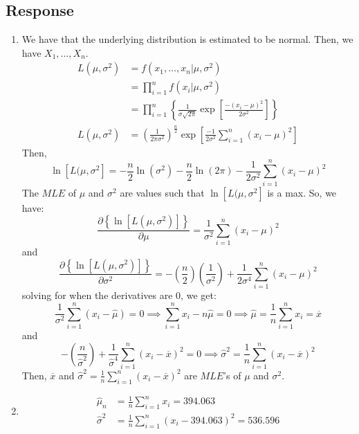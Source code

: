 \documentclass[13pt]{article}
\begin{document}
\subsection*{Response}
\begin{enumerate}[label=(\alph*)]
\item We have that the underlying distribution is estimated to be normal. Then, we have $X_1, \ldots, X_n$.
  \begin{align*}
    L(\mu, \sigma^2) &= f(x_1, \ldots, x_n | \mu, \sigma^2) \\
                     &= \prod_{i = 1}^{n} f(x_i | \mu, \sigma^2) \\
                     &= \prod_{i = 1}^{n} \left\{ \frac{1}{\sigma \sqrt{2\pi}}
                       \exp \left[ \frac{-(x_i - \mu)^2}{2\sigma^2} \right]\right\} \\
    L(\mu, \sigma^2) &= \left( \frac{1}{2 \pi \sigma^2} \right)^{\frac{n}{2}}
                       \exp \left[ \frac{-1}{2\sigma^2} \sum_{i = 1}^{n}(x_i - \mu)^2 \right]
  \end{align*}
  Then,
  \[\ln\left[ L(\mu, \sigma^2 \right] =
  -\frac{n}{2}\ln \left(\sigma^2\right)
  - \frac{n}{2}\ln \left(2 \pi \right)
  - \frac{1}{2\sigma^2}\sum\limits_{i = 1}^{n}(x_i - \mu)^2\]
  The $MLE$ of $\mu$ and $\sigma^2$ are values such that $\ln\left[ L(\mu, \sigma^2 \right]$ is a max. So, we have:
  \[\frac{\partial \left\{ \ln \left[ L(\mu, \sigma^2) \right] \right\}}{\partial \mu}
    = \frac{1}{\sigma^2}\sum\limits_{i = 1}^{n}(x_i - \mu)^2\]
  and
  \[\frac{\partial \left\{ \ln \left[ L(\mu, \sigma^2) \right] \right\}}{\partial \sigma^2}
    = -\left( \frac{n}{2} \right) \left( \frac{1}{\sigma^2} \right) +
    \frac{1}{2\sigma^4}\sum\limits_{i = 1}^{n}(x_i - \mu)^2\]
  solving for when the derivatives are 0, we get:
  \[\frac{1}{\sigma^2} \sum\limits_{i = 1}^{n} (x_i - \hat{\mu}) = 0
    \implies \sum\limits_{i = 1}^{n}x_i - n \hat{\mu} = 0
    \implies \hat{\mu} = \frac{1}{n} \sum\limits_{i = 1}^{n}x_i = \overline{x}\]
  and
  \[-\left( \frac{n}{\hat{\sigma}^2} \right) +
    \frac{1}{\hat{\sigma}^4} \sum\limits_{i = 1}^{n}(x_i - \overline{x})^2 = 0
    \implies \hat{\sigma}^2 = \frac{1}{n} \sum\limits_{i = 1}^{n}(x_i - \overline{x})^2\]
  Then, $\overline{x}$ and $\hat{\sigma}^2 = \frac{1}{n} \sum\limits_{i = 1}^{n}(x_i - \overline{x})^2$ are
  $MLE$'s of $\mu$ and $\sigma^2$.
  
\item
  \begin{align*}
    \hat{\mu}_n &= \frac{1}{n}\sum\limits_{i = 1}^{n}x_i = 394.063 \\
    \hat{\sigma}^2 &= \frac{1}{n}\sum\limits_{i = 1}^{n}(x_i - 394.063)^2 = 536.596
  \end{align*}


\end{enumerate}
\end{document}
